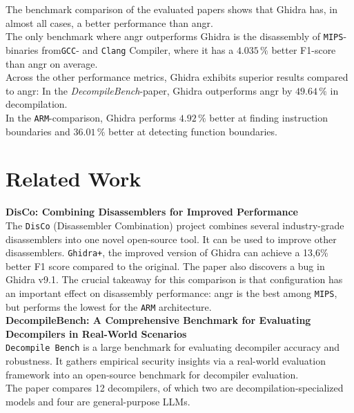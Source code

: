 \documentclass[seminar]{plai}
\begin{document}
The benchmark comparison of the evaluated papers shows that Ghidra has, in almost all cases, a better performance than angr.\\
The only benchmark where angr outperforms Ghidra is the disassembly of \texttt{MIPS}-binaries from\texttt{GCC}- and \texttt{Clang} Compiler, where it has a $4.035\,\%$ better F1-score than angr on average.\cite{DisCo-combining-disassemblers-for-improved-performance}\\
Across the other performance metrics, Ghidra exhibits superior results compared to angr: In the \textit{DecompileBench}-paper, Ghidra outperforms angr by $49.64\,\%$ in decompilation.\cite{decompileBench-comprehensice-benchmark-for-evaluating-decompilers-in-real-world-scenarios}\\
In the \texttt{ARM}-comparison, Ghidra performs $4.92\,\%$ better at finding instruction boundaries and $36.01\,\%$ better at detecting function boundaries.\cite{an-empirical-study-on-ARM-disassembly-disassembly-tools}

\section{Related Work}
\label{sec:related-work}
\textbf{DisCo: Combining Disassemblers for Improved Performance}\\
The \texttt{DisCo} (Disassembler Combination) project combines several industry-grade disassemblers into one novel open-source tool. It can be used to improve other disassemblers. \texttt{Ghidra+}, the improved version of Ghidra can achieve a 13,6\% better F1 score compared to the original. The paper also discovers a bug in Ghidra v9.1. The crucial takeaway for this comparison is that configuration has an important effect on disassembly performance: angr is the best among \texttt{MIPS}, but performs the lowest for the \texttt{ARM} architecture.\cite{DisCo-combining-disassemblers-for-improved-performance}\\

\noindent\textbf{DecompileBench: A Comprehensive Benchmark for Evaluating Decompilers in Real-World Scenarios}\\
\texttt{Decompile Bench} is a large benchmark for evaluating decompiler accuracy and robustness. It gathers empirical security insights via a real-world evaluation framework into an open-source benchmark for decompiler evaluation.\\
The paper compares 12 decompilers, of which two are decompilation-specialized models and four are general-purpose LLMs.\cite{decompileBench-comprehensice-benchmark-for-evaluating-decompilers-in-real-world-scenarios}\\
\end{document}
